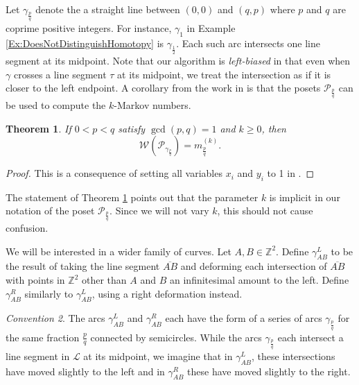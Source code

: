 \documentclass[12pt, letterpaper,table]{amsart}
\newtheorem{theorem}{Theorem}
\theoremstyle{remark}
\newtheorem{convention}[theorem]{Convention}
\newcommand{\fpq}{\frac{p}{q}}
\newcommand{\calP}{\mathcal{P}}
\begin{document}
Let $\gamma_\fpq$ denote the a straight line between $(0,0)$ and $(q,p)$ where $p$ and $q$ are coprime positive integers. For instance, $\gamma_1$ in Example \ref{Ex:DoesNotDistinguishHomotopy} is $\gamma_{\frac12}$. Each such arc intersects one line segment at its midpoint. Note that our algorithm is \emph{left-biased} in that even when $\gamma$ crosses a line segment $\tau$ at its midpoint, we treat the intersection as if it is closer to the left endpoint.  A corollary from the work in \cite{BG}  is that the posets $\calP_{\fpq}$ can be used to compute the $k$-Markov numbers.


\begin{theorem}\label{thm:ComputeKMarkov}
If $0 < p < q$ satisfy $\gcd(p,q) = 1$ and $k \geq 0$, then \[
\mathcal{W}(\calP_{\gamma_\fpq}) = m^{(k)}_{\fpq}.
\]
\end{theorem}

\begin{proof}
This is a consequence of setting all variables $x_i$ and $y_i$ to 1 in \cite[Theorem 8.30]{BG}.
\end{proof}

The statement of Theorem \ref{thm:ComputeKMarkov} points out that the parameter $k$ is implicit in our notation of the poset $\calP_\fpq$. Since we will not vary $k$, this should not cause confusion.

We will be interested in a wider family of curves. Let $A,B \in \mathbb{Z}^2$. Define $\gamma_{AB}^L$ to be the result of taking the line segment $\overline{AB}$ and deforming each intersection of $\overline{AB}$ with  points in $\mathbb{Z}^2$ other than $A$ and $B$ an infinitesimal amount to the left.  
Define $\gamma_{AB}^R$ similarly to $\gamma_{AB}^L$, using a right deformation instead. 

\begin{convention}\label{conv:gammaABLR}
The arcs $\gamma_{AB}^L$ and $\gamma_{AB}^R$ each have the form of a series of arcs $\gamma_\fpq$ for the same fraction $\fpq$ connected by semicircles. While the arcs $\gamma_\fpq$ each intersect a line segment in $\mathcal{L}$ at its midpoint, we imagine that in $\gamma_{AB}^L$, these intersections have moved slightly to the left and in $\gamma_{AB}^R$ these have moved slightly to the right. 
\end{convention}
\end{document}
